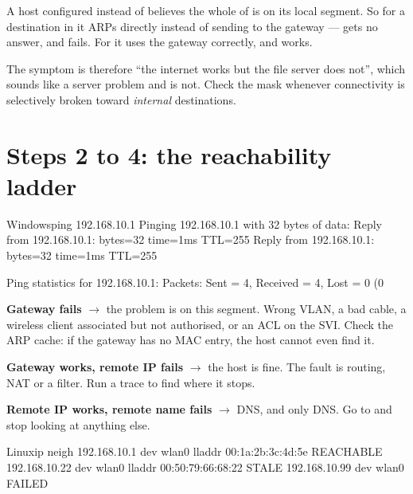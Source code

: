 \begin{conceptbox}
A host configured  instead of  believes the whole
of  is on its local segment. So for a destination in
 it ARPs directly instead of sending to the gateway ---
gets no answer, and fails. For  it uses the gateway correctly, and
works.

The symptom is therefore ``the internet works but the file server does not'',
which sounds like a server problem and is not. Check the mask whenever
connectivity is selectively broken toward \emph{internal} destinations.
\end{conceptbox}

\section{Steps 2 to 4: the reachability ladder}

\begin{hostcmd}{Windows}{ping 192.168.10.1}
Pinging 192.168.10.1 with 32 bytes of data:
Reply from 192.168.10.1: bytes=32 time=1ms TTL=255
Reply from 192.168.10.1: bytes=32 time=1ms TTL=255

Ping statistics for 192.168.10.1:
    Packets: Sent = 4, Received = 4, Lost = 0 (0%
\end{hostcmd}

\begin{tight}
  \item \textbf{Gateway fails} $\rightarrow$ the problem is on this segment. Wrong
        VLAN, a bad cable, a wireless client associated but not authorised, or an
        ACL on the SVI. Check the ARP cache: if the gateway has no MAC entry, the
        host cannot even find it.
  \item \textbf{Gateway works, remote IP fails} $\rightarrow$ the host is fine.
        The fault is routing, NAT or a filter. Run a trace to find where it
        stops.
  \item \textbf{Remote IP works, remote name fails} $\rightarrow$ DNS, and only
        DNS. Go to  and stop looking at anything else.
\end{tight}

\begin{hostcmd}{Linux}{ip neigh}
192.168.10.1 dev wlan0 lladdr 00:1a:2b:3c:4d:5e REACHABLE
192.168.10.22 dev wlan0 lladdr 00:50:79:66:68:22 STALE
192.168.10.99 dev wlan0  FAILED
\end{hostcmd}

